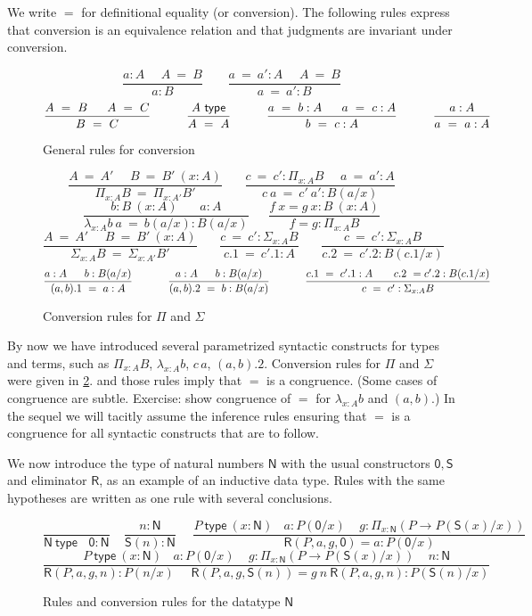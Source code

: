 \documentclass[11pt,a4paper]{article}
\theoremstyle{definition}
\newcommand{\conv}{=}
\newcommand{\NN}{\mathsf{N}}
\newcommand{\ZERO}{\mathsf{0}}
\newcommand{\SUCC}{\mathsf{S}}
\newcommand{\type}{\mathsf{type}}
\newcommand{\mylam}[3]{\lambda_{#1:#2}#3}
\newcommand{\mypi}[3]{\Pi_{#1:#2}#3}
\newcommand{\mysig}[3]{\Sigma_{#1:#2}#3}
\newcommand{\app}[2]{{#1\,#2}} %
\newcommand{\Sapp}[1]{\sapp{\SUCC}{#1}}
\newcommand{\sapp}[2]{{#1(#2)}} %
\newcommand{\NRapp}[4]{\sapp{\RR}{#1,#2,#3,#4}}
\newcommand{\RR}{\mathsf{R}}
\begin{document}
We write $\conv$ for definitional equality (or conversion).
The following rules express that conversion is an equivalence
relation and that judgments are invariant under conversion.

\begin{figure}[h]
  \caption{General rules for conversion}\label{fig:conversion}
$$
\frac{ a:A~~~~~~ A~ \conv~ B}{ a:B}~~~~~~~~~
\frac{ a ~\conv~a':A~~~~~~ A  ~\conv~ B}{ a ~\conv~a':B}
$$
$$
\frac{A~=~B~~~~~A~=~C}{B~=~C}~~~~~~~~~\frac{A~\type}{A~=~A}~~~~~~~~~
\frac{a~=~b:A~~~~~a~=~c:A}{b~=~c:A}~~~~~~~~~\frac{a:A}{a~=~a:A}
\belowdisplayshortskip 1pt
$$
\end{figure}

\begin{figure}[H]
  \caption{Conversion rules for $\Pi$ and $\Sigma$}\label{fig:convPiSig}
$$
\frac{A~=~A'~~~~~~B~=~B'~(x:A)}{\mypi{x}{A}{B}~=~\mypi{x}{A'}{B'}}~~~~~~~~
\frac{c~=~c':\mypi{x}{A}{B}~~~~~~a~=~a':A}{c~a~=~c'~a':B(a/x)}
$$
$$
\frac{b:B~(x:A)~~~~~~~~ a:A}{ \mylam{x}{A}{b}~a  ~\conv~ b(a/x):B(a/x)}
~~~~~~~
\frac{f~x = g~x:B~(x:A)}{ f = g : \mypi{x}{A}{B}}
$$
$$
\frac{A~=~A'~~~~~~B~=~B'~(x:A)}{\mysig{x}{A}{B}~=~\mysig{x}{A'}{B'}}~~~~~~~~
\frac{c~=~c':\mysig{x}{A}{B}}{c.1~=~c'.1:A}~~~~~~~~
\frac{c~=~c':\mysig{x}{A}{B}}{c.2~=~c'.2:B(c.1/x)}~~~~~~~~
$$
$$
\frac{a:A~~~~~b:B(a/x)}{ (a,b).1 ~\conv~ a:A}~~~~~~~~~~
\frac{a:A~~~~~b:B(a/x)}{ (a,b).2 ~\conv~ b:B(a/x)}~~~~~~~~~~
\frac{c.1~=~ c'.1:A~~~~~~c.2~=c'.2:B(c.1/x)}{ c~=~ c' : \mysig{x}{A}{B}}
\belowdisplayshortskip 0pt
$$
\end{figure}

By now we have introduced several parametrized syntactic constructs
for types and terms, such as $\mypi{x}{A}{B}$,
$\mylam{x}{A}{b}$, $\app{c}{a}$, $(a,b).2$.
Conversion rules for $\Pi$ and $\Sigma$ were given in \cref{fig:convPiSig}.
and those rules imply that $=$ is a congruence.%
(Some cases of congruence are subtle. Exercise:
show congruence of $=$ for $\mylam{x}{A}{b}$ and $(a,b)$.)
In the sequel we will tacitly assume the inference rules
ensuring that $=$ is a congruence for all syntactic constructs
that are to follow.

We now introduce the type of natural numbers $\NN$ with
the usual constructors $\ZERO,\SUCC$ and eliminator $\RR$,
as an example of an inductive data type.
Rules with the same hypotheses are written as one rule with
several conclusions.

\begin{figure}[H]
  \caption{Rules and conversion rules for the datatype $\NN$}\label{fig:typeN}
$$
\frac{}{\NN~\type~~~~\ZERO:\NN}~~~~~
\frac{n:\NN}{\Sapp{n} : \NN}~~~~~~
\frac{P~\type~(x:\NN)~~~~a:P(\ZERO/x)~~~~~
g:\mypi{x}{\NN}{(P\to P(\Sapp{x}/x))}}
{\NRapp{P}{a}{g}{\ZERO} = a: P(\ZERO/x) }
$$
$$
\frac{P~\type~(x:\NN)~~~~a:P(\ZERO/x)~~~~~
g:\mypi{x}{\NN}{(P\to P(\Sapp{x}/x))}~~~~~n:\NN}
{\NRapp{P}{a}{g}{n}:P(n/x)~~~~~~\NRapp{P}{a}{g}{\Sapp{n}} = g~n~\NRapp{P}{a}{g}{n}: P(\Sapp{n}/x) }
$$
\end{figure}
\end{document}
